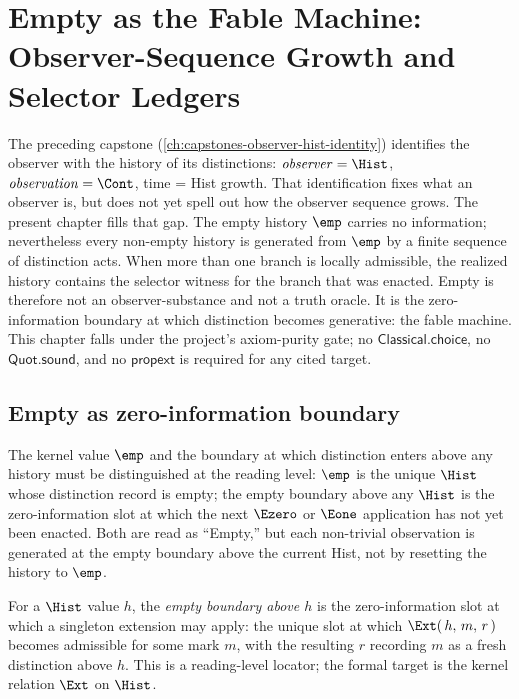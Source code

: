 \chapter{Empty as the Fable Machine: Observer-Sequence Growth and Selector Ledgers}
\label{ch:capstones-empty-fable-machine}

The preceding capstone (\autoref{ch:capstones-observer-hist-identity}) identifies the observer with the history of its distinctions: $\mathit{observer} = \Hist$, $\mathit{observation} = \Cont$, time = Hist growth. That identification fixes what an observer is, but does not yet spell out how the observer sequence grows. The present chapter fills that gap. The empty history $\emp$ carries no information; nevertheless every non-empty history is generated from $\emp$ by a finite sequence of distinction acts. When more than one branch is locally admissible, the realized history contains the selector witness for the branch that was enacted. Empty is therefore not an observer-substance and not a truth oracle. It is the zero-information boundary at which distinction becomes generative: the fable machine. This chapter falls under the project's axiom-purity gate; no $\mathsf{Classical.choice}$, no $\mathsf{Quot.sound}$, and no $\mathsf{propext}$ is required for any cited target.

\section{Empty as zero-information boundary}
\label{sec:efm-empty-vs-e}

The kernel value $\emp$ and the boundary at which distinction enters above any history must be distinguished at the reading level: $\emp$ is the unique $\Hist$ whose distinction record is empty; the empty boundary above any $\Hist$ is the zero-information slot at which the next $\Ezero$ or $\Eone$ application has not yet been enacted. Both are read as ``Empty,'' but each non-trivial observation is generated at the empty boundary above the current Hist, not by resetting the history to $\emp$.

\begin{definition}
\label{def:efm-empty-boundary}
For a $\Hist$ value $h$, the \emph{empty boundary above $h$} is the zero-information slot at which a singleton extension may apply: the unique slot at which $\Ext(\,h,\,m,\,r\,)$ becomes admissible for some mark $m$, with the resulting $r$ recording $m$ as a fresh distinction above $h$. This is a reading-level locator; the formal target is the kernel relation $\Ext$ on $\Hist$.
\end{definition}

